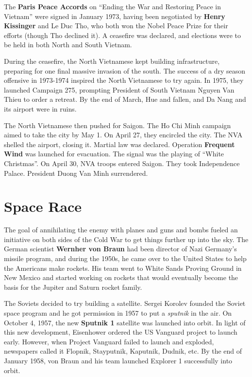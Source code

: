The \textbf{Paris Peace Accords} on ``Ending the War and Restoring Peace in Vietnam'' were signed in January 1973,
having been negotiated by \textbf{Henry Kissinger} and Le Duc Tho,
who both won the Nobel Peace Prize for their efforts (though Tho declined it).
A ceasefire was declared, and elections were to be held in both North and South Vietnam.

During the ceasefire, the North Vietnamese kept building infrastructure,
preparing for one final massive invasion of the south.
The success of a dry season offensive in 1973-1974 inspired the North Vietnamese to try again.
In 1975, they launched Campaign 275, prompting President of South Vietnam Nguyen Van Thieu to order a retreat.
By the end of March, Hue and fallen, and Da Nang and its airport were in ruins.

The North Vietnamese then pushed for Saigon.
The Ho Chi Minh campaign aimed to take the city by May 1.
On April 27, they encircled the city.
The NVA shelled the airport, closing it.
Martial law was declared.
Operation \textbf{Frequent Wind} was launched for evacuation.
The signal was the playing of ``White Christmas''.
On April 30, NVA troops entered Saigon.
They took Independence Palace.
President Duong Van Minh surrendered.

\section{Space Race}

The goal of annihilating the enemy with planes and guns and bombs
fueled an initiative on both sides of the Cold War to get things further up into the sky.
The German scientist \textbf{Wernher von Braun} had been director of Nazi Germany's missile program,
and during the 1950s, he came over to the United States to help the Americans make rockets.
His team went to White Sands Proving Ground in New Mexico and started working on rockets
that would eventually become the basis for the Jupiter and Saturn rocket family.

The Soviets decided to try building a satellite.
Sergei Korolev founded the Soviet space program and he got permission in 1957 to put a \textit{sputnik} in the air.
On October 4, 1957, the new \textbf{Sputnik 1} satellite was launched into orbit.
In light of this new development, Eisenhower ordered the US Vanguard project to launch early.
However, when Project Vanguard failed to launch and exploded,
newspapers called it Flopnik, Stayputnik, Kaputnik, Dudnik, etc.
By the end of January 1958, von Braun and his team launched Explorer 1 successfully into orbit.


